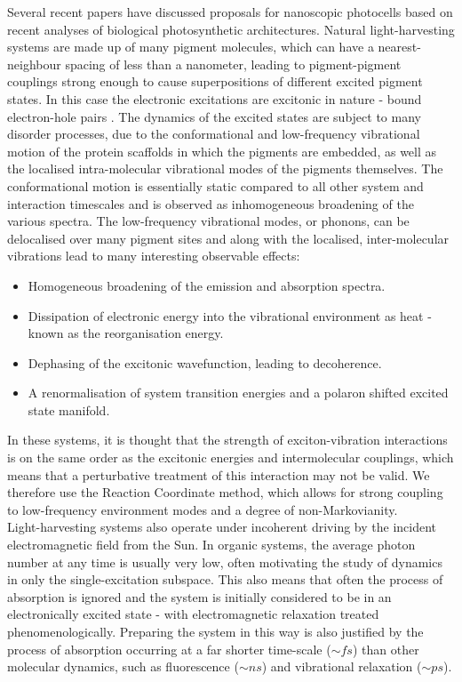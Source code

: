 \documentclass[]{article}
\begin{document}
Several recent papers have discussed proposals for nanoscopic photocells based on recent analyses of biological photosynthetic architectures\cite{Dorfman}\cite{Creatore2013}\cite{Killoran2015}\cite{Fruchtman2016}. Natural light-harvesting systems are made up of many pigment molecules, which can have a nearest-neighbour spacing of less than a nanometer\cite{Adolphs2006}, leading to pigment-pigment couplings strong enough to cause superpositions of different excited pigment states. In this case the electronic excitations are excitonic in nature - bound electron-hole pairs . The dynamics of the excited states are subject to many disorder processes, due to the conformational and low-frequency vibrational motion of the protein scaffolds in which the pigments are embedded, as well as the localised intra-molecular vibrational modes of the pigments themselves. The conformational motion is essentially static compared to all other system and interaction timescales and is observed as inhomogeneous broadening of the various spectra. The low-frequency vibrational modes, or phonons, can be delocalised over many pigment sites and along with the localised, inter-molecular vibrations lead to many interesting observable effects:
\begin{itemize}
	\item Homogeneous broadening of the emission and absorption spectra.
	\item Dissipation of electronic energy into the vibrational environment as heat - known as the reorganisation energy.
	\item Dephasing of the excitonic wavefunction, leading to decoherence.
	\item A renormalisation of system transition energies and a polaron shifted excited state manifold.
\end{itemize}
In these systems, it is thought that the strength of exciton-vibration interactions is on the same order as the excitonic energies and intermolecular couplings, which means that a perturbative treatment of this interaction may not be valid. We therefore use the Reaction Coordinate method, which allows for strong coupling to low-frequency environment modes and a degree of non-Markovianity. 
\\
Light-harvesting systems also operate under incoherent driving by the incident electromagnetic field from the Sun. In organic systems, the average photon number at any time is usually very low, often motivating the study of dynamics in only the single-excitation subspace. This also means that often the process of absorption is ignored and the system is initially considered to be in an electronically excited state - with electromagnetic relaxation treated phenomenologically. Preparing the system in this way is also justified by the process of absorption occurring at a far shorter time-scale ($\sim fs$) than other molecular dynamics, such as fluorescence ($\sim ns$) and vibrational relaxation ($\sim ps$). 
\end{document}
